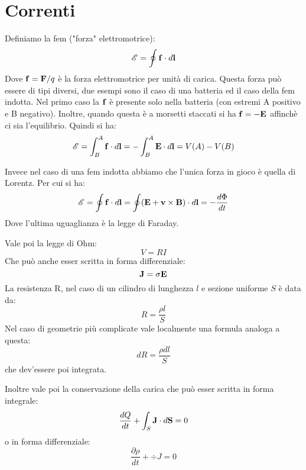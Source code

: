 \section{Correnti} %
\label{sec:correnti}

Definiamo la fem ("forza" elettromotrice):
\begin{equation}
    \mathscr{E} = \oint \mathbf f \cdot d \mathbf l
\end{equation}
Dove $\mathbf f = \mathbf F/q$ è la forza elettromotrice per unità di carica. Questa forza può essere di tipi diversi, due esempi sono il caso di una batteria ed il caso della fem indotta. Nel primo caso la $\mathbf f$ è presente solo nella batteria (con estremi A positivo e B negativo). Inoltre, quando questa è a morsetti staccati si ha $\mathbf f = - \mathbf E$ affinchè ci sia l'equilibrio. Quindi si ha:
\begin{equation}
    \mathscr{E} = \int_B^A \mathbf f \cdot d \mathbf l = - \int_B^A \mathbf E \cdot d \mathbf l = V(A) - V(B)
\end{equation}

Invece nel caso di una fem indotta abbiamo che l'unica forza in gioco è quella di Lorentz. Per cui si ha:
\begin{equation}
    \mathscr{E} = \oint \mathbf f \cdot d \mathbf l = \oint (\mathbf {E + v \times B}) \cdot d \mathbf l  = -\frac{ d\Phi }{ dt } 
\end{equation}
Dove l'ultima uguaglianza è la legge di Faraday.

Vale poi la legge di Ohm:
\begin{equation}
    V=RI
\end{equation}
Che può anche esser scritta in forma differenziale:
\begin{equation}
    \mathbf J = \sigma \mathbf E
\end{equation}
La resistenza R, nel caso di un cilindro di lunghezza $l$ e sezione uniforme $S$ è data da:
\begin{equation}
    R = \frac{ \rho l  }{ S } 
\end{equation}
Nel caso di geometrie più complicate vale localmente una formula analoga a questa:
\begin{equation}
    dR = \frac{ \rho dl  }{ S } 
\end{equation}
che dev'essere poi integrata.

Inoltre vale poi la conservazione della carica che può esser scritta in forma integrale:
\begin{equation}
    \frac{ dQ }{ dt } + \int_S \mathbf J \cdot d \mathbf S = 0
\end{equation}
o in forma differenziale:
\begin{equation}
    \frac{ \partial \rho }{ dt } + \div J = 0
\end{equation}

